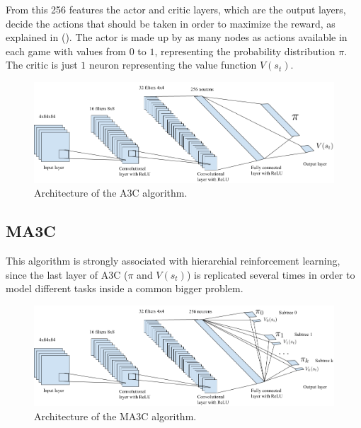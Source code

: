 From this 256 features the actor and critic layers, which are the output layers, decide the actions that should be taken
in order to maximize the reward, as explained in ().
The actor is made up by as many nodes as actions available in each game with values from $0$ to $1$, representing the
probability distribution $\pi$.
The critic is just $1$ neuron representing the value function $V(s_t)$.

\begin{figure}[hbtp]
\begin{center}
\includegraphics[width=430]{img/A3C_architecture.png}
\end{center}
\caption[A3C architecture]
{Architecture of the \ac{A3C} algorithm.}
\label{fig:A3C}
\end{figure}

\subsection{\acl{MA3C}\label{subsec:MA3C}}

This algorithm is strongly associated with hierarchial reinforcement learning, since the last layer of \ac{A3C}
($\pi$ and $V(s_t)$) is replicated several times in order to model different tasks inside a common bigger problem.

\begin{figure}[hbtp]
\begin{center}
\includegraphics[width=430]{img/MA3C_architecture.png}
\end{center}
\caption[MA3C architecture]
{Architecture of the \ac{MA3C} algorithm.}
\label{fig:MA3C}
\end{figure}

